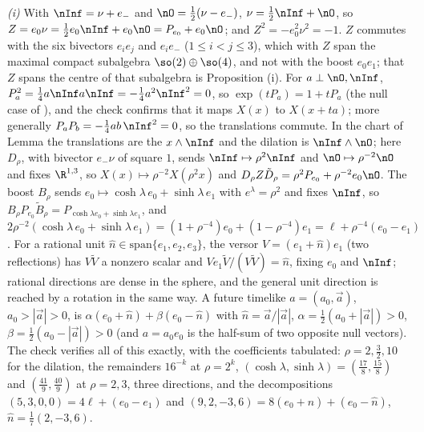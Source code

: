 \emph{(i)} With $\nInf = \nu + e_{-}$ and $\nO = \tfrac12(\nu - e_{-})$, $\nu = \tfrac12\nInf + \nO$, so $Z = e_{0}\nu = \tfrac12 e_{0}\nInf + e_{0}\nO = P_{e_{0}} + e_{0}\nO$; and $Z^{2} = -e_{0}^{2}\nu^{2} = -1$. $Z$ commutes with the six bivectors $e_{i}e_{j}$ and $e_{i}e_{-}$ ($1 \le i < j \le 3$), which with $Z$ span the maximal compact subalgebra $\so(2)\oplus\so(4)$, and not with the boost $e_{0}e_{1}$; that $Z$ spans the centre of that subalgebra is Proposition (i). For $a \perp \nO, \nInf$, $P_{a}^{2} = \tfrac14 a\nInf a\nInf = -\tfrac14 a^{2}\nInf^{2} = 0$, so $\exp(tP_{a}) = 1 + tP_{a}$ (the null case of ), and the check confirms that it maps $X(x)$ to $X(x + ta)$; more generally $P_{a}P_{b} = -\tfrac14 ab\,\nInf^{2} = 0$, so the translations commute. In the chart of Lemma  the translations are the $x\wedge\nInf$ and the dilation is $\nInf\wedge\nO$; here $D_{\rho}$, with bivector $e_{-}\nu$ of square $1$, sends $\nInf \mapsto \rho^{2}\nInf$ and $\nO \mapsto \rho^{-2}\nO$ and fixes $\R^{1,3}$, so $X(x) \mapsto \rho^{-2}X(\rho^{2}x)$ and $D_{\rho}Z\tilde D_{\rho} = \rho^{2}P_{e_{0}} + \rho^{-2}e_{0}\nO$. The boost $B_{\rho}$ sends $e_{0} \mapsto \cosh\lambda\,e_{0} + \sinh\lambda\,e_{1}$ with $e^{\lambda} = \rho^{2}$ and fixes $\nInf$, so $B_{\rho}P_{e_{0}}\tilde B_{\rho} = P_{\cosh\lambda e_{0} + \sinh\lambda e_{1}}$, and $2\rho^{-2}(\cosh\lambda\,e_{0} + \sinh\lambda\,e_{1}) = (1 + \rho^{-4})e_{0} + (1 - \rho^{-4})e_{1} = \ell + \rho^{-4}(e_{0} - e_{1})$. For a rational unit $\hat n \in \mathrm{span}\{e_{1}, e_{2}, e_{3}\}$, the versor $V = (e_{1} + \hat n)e_{1}$ (two reflections) has $V\tilde V$ a nonzero scalar and $V e_{1}\tilde V/(V\tilde V) = \hat n$, fixing $e_{0}$ and $\nInf$; rational directions are dense in the sphere, and the general unit direction is reached by a rotation in the same way. A future timelike $a = (a_{0}, \vec a)$, $a_{0} > |\vec a| > 0$, is $\alpha(e_{0} + \hat n) + \beta(e_{0} - \hat n)$ with $\hat n = \vec a/|\vec a|$, $\alpha = \tfrac12(a_{0} + |\vec a|) > 0$, $\beta = \tfrac12(a_{0} - |\vec a|) > 0$ (and $a = a_{0}e_{0}$ is the half-sum of two opposite null vectors). The check verifies all of this exactly, with the coefficients tabulated: $\rho = 2, \tfrac32, 10$ for the dilation, the remainders $16^{-k}$ at $\rho = 2^{k}$, $(\cosh\lambda, \sinh\lambda) = (\tfrac{17}{8}, \tfrac{15}{8})$ and $(\tfrac{41}{9}, \tfrac{40}{9})$ at $\rho = 2, 3$, three directions, and the decompositions $(5,3,0,0) = 4\ell + (e_{0} - e_{1})$ and $(9, 2, -3, 6) = 8(e_{0} + \hat n) + (e_{0} - \hat n)$, $\hat n = \tfrac17(2, -3, 6)$.

